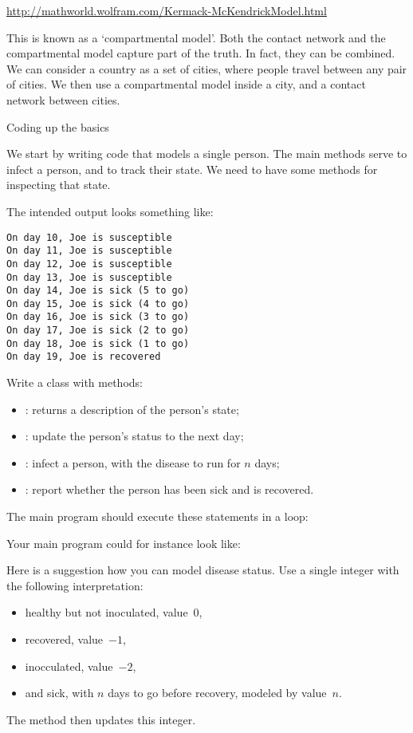 \url{http://mathworld.wolfram.com/Kermack-McKendrickModel.html}

This is known as a `compartmental model'. Both the contact network and
the compartmental model capture part of the truth. In fact, they can
be combined. We can consider a country as a set of cities, where
people travel between any pair of cities. We then use a compartmental
model inside a city, and a contact network between cities.

 {Coding up the basics}

\prerequisite{\ref{ch:object}}

We start by writing code that models a single person. The main methods
serve to infect a person, and to track their state. We need to have
some methods for inspecting that state. 

The intended output looks something like:
\begin{verbatim}
On day 10, Joe is susceptible
On day 11, Joe is susceptible
On day 12, Joe is susceptible
On day 13, Joe is susceptible
On day 14, Joe is sick (5 to go)
On day 15, Joe is sick (4 to go)
On day 16, Joe is sick (3 to go)
On day 17, Joe is sick (2 to go)
On day 18, Joe is sick (1 to go)
On day 19, Joe is recovered
\end{verbatim}

\begin{exercise}
  \label{ex:infect:person}
  Write a  class with methods:
  \begin{itemize}
  \item {} : returns a description of the
    person's state;
  \item {} : update the person's status to the next day;
  \item {} : infect a person, with the disease to run for
    $n$ days;
  \item {} : report whether the person has been sick and
    is recovered.
  \end{itemize}
  The main program should execute these statements in a loop:
\end{exercise}

Your main program could for instance look like:

Here is a suggestion how you can model 
disease status. Use a single integer with the following interpretation:
\begin{itemize}
\item healthy but not inoculated, value~$0$,
\item recovered, value~$-1$,
\item inocculated, value~$-2$,
\item and sick, with $n$ days to go before recovery,  modeled by value~$n$.
\end{itemize}
The  method then updates this integer.

